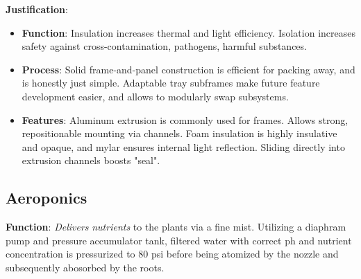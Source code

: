 \documentclass{report}
\begin{document}
\textbf{Justification}: 
\begin{itemize}
    \item \textbf{Function}: Insulation increases thermal and light efficiency. Isolation increases safety against cross-contamination, pathogens, harmful substances.
    \item \textbf{Process}: Solid frame-and-panel construction is efficient for packing away, and is honestly just simple. Adaptable tray subframes make future feature development easier, and allows to modularly swap subsystems.
    \item \textbf{Features}: Aluminum extrusion is commonly used for frames. Allows strong, repositionable mounting via channels. Foam insulation is highly insulative and opaque, and mylar ensures internal light reflection. Sliding directly into extrusion channels boosts "seal".
\end{itemize}

\newpage

\subsection{Aeroponics}
\label{sec:aeroponics}

\textbf{Function}: \textit{Delivers} \textit{nutrients} to the plants via a fine mist. Utilizing a diaphram pump and pressure accumulator tank, filtered water with correct ph and nutrient concentration is pressurized to 80 psi before being atomized by the nozzle and subsequently abosorbed by the roots.
\end{document}
